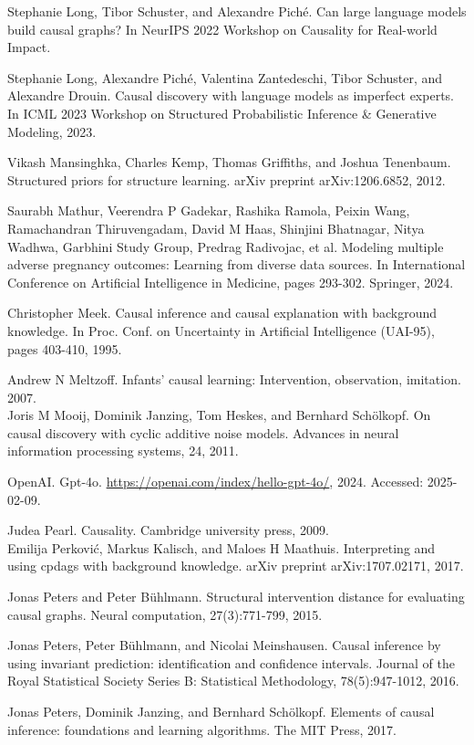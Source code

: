 \documentclass[10pt]{article}
\begin{document}
Stephanie Long, Tibor Schuster, and Alexandre Piché. Can large language models build causal graphs? In NeurIPS 2022 Workshop on Causality for Real-world Impact.

Stephanie Long, Alexandre Piché, Valentina Zantedeschi, Tibor Schuster, and Alexandre Drouin. Causal discovery with language models as imperfect experts. In ICML 2023 Workshop on Structured Probabilistic Inference \& Generative Modeling, 2023.

Vikash Mansinghka, Charles Kemp, Thomas Griffiths, and Joshua Tenenbaum. Structured priors for structure learning. arXiv preprint arXiv:1206.6852, 2012.

Saurabh Mathur, Veerendra P Gadekar, Rashika Ramola, Peixin Wang, Ramachandran Thiruvengadam, David M Haas, Shinjini Bhatnagar, Nitya Wadhwa, Garbhini Study Group, Predrag Radivojac, et al. Modeling multiple adverse pregnancy outcomes: Learning from diverse data sources. In International Conference on Artificial Intelligence in Medicine, pages 293-302. Springer, 2024.

Christopher Meek. Causal inference and causal explanation with background knowledge. In Proc. Conf. on Uncertainty in Artificial Intelligence (UAI-95), pages 403-410, 1995.

Andrew N Meltzoff. Infants' causal learning: Intervention, observation, imitation. 2007.\\
Joris M Mooij, Dominik Janzing, Tom Heskes, and Bernhard Schölkopf. On causal discovery with cyclic additive noise models. Advances in neural information processing systems, 24, 2011.

OpenAI. Gpt-4o. \href{https://openai.com/index/hello-gpt-4o/}{https://openai.com/index/hello-gpt-4o/}, 2024. Accessed: 2025-02-09.

Judea Pearl. Causality. Cambridge university press, 2009.\\
Emilija Perković, Markus Kalisch, and Maloes H Maathuis. Interpreting and using cpdags with background knowledge. arXiv preprint arXiv:1707.02171, 2017.

Jonas Peters and Peter Bühlmann. Structural intervention distance for evaluating causal graphs. Neural computation, 27(3):771-799, 2015.

Jonas Peters, Peter Bühlmann, and Nicolai Meinshausen. Causal inference by using invariant prediction: identification and confidence intervals. Journal of the Royal Statistical Society Series B: Statistical Methodology, 78(5):947-1012, 2016.

Jonas Peters, Dominik Janzing, and Bernhard Schölkopf. Elements of causal inference: foundations and learning algorithms. The MIT Press, 2017.
\end{document}
